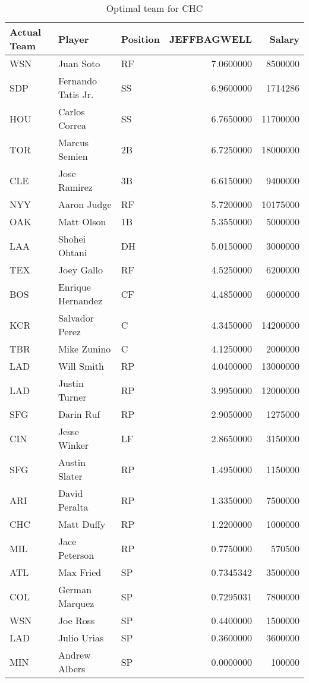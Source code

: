 \begin{table}

\caption{Optimal team for CHC}
\centering
\begin{tabular}[t]{l|l|l|r|r}
\hline
Actual Team & Player & Position & JEFFBAGWELL & Salary\\
\hline
WSN & Juan Soto & RF & 7.0600000 & 8500000\\
\hline
SDP & Fernando Tatis Jr. & SS & 6.9600000 & 1714286\\
\hline
HOU & Carlos Correa & SS & 6.7650000 & 11700000\\
\hline
TOR & Marcus Semien & 2B & 6.7250000 & 18000000\\
\hline
CLE & Jose Ramirez & 3B & 6.6150000 & 9400000\\
\hline
NYY & Aaron Judge & RF & 5.7200000 & 10175000\\
\hline
OAK & Matt Olson & 1B & 5.3550000 & 5000000\\
\hline
LAA & Shohei Ohtani & DH & 5.0150000 & 3000000\\
\hline
TEX & Joey Gallo & RF & 4.5250000 & 6200000\\
\hline
BOS & Enrique Hernandez & CF & 4.4850000 & 6000000\\
\hline
KCR & Salvador Perez & C & 4.3450000 & 14200000\\
\hline
TBR & Mike Zunino & C & 4.1250000 & 2000000\\
\hline
LAD & Will Smith & RP & 4.0400000 & 13000000\\
\hline
LAD & Justin Turner & RP & 3.9950000 & 12000000\\
\hline
SFG & Darin Ruf & RP & 2.9050000 & 1275000\\
\hline
CIN & Jesse Winker & LF & 2.8650000 & 3150000\\
\hline
SFG & Austin Slater & RP & 1.4950000 & 1150000\\
\hline
ARI & David Peralta & RP & 1.3350000 & 7500000\\
\hline
CHC & Matt Duffy & RP & 1.2200000 & 1000000\\
\hline
MIL & Jace Peterson & RP & 0.7750000 & 570500\\
\hline
ATL & Max Fried & SP & 0.7345342 & 3500000\\
\hline
COL & German Marquez & SP & 0.7295031 & 7800000\\
\hline
WSN & Joe Ross & SP & 0.4400000 & 1500000\\
\hline
LAD & Julio Urias & SP & 0.3600000 & 3600000\\
\hline
MIN & Andrew Albers & SP & 0.0000000 & 100000\\
\hline
\end{tabular}
\end{table}
